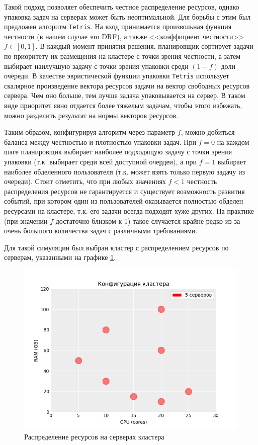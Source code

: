 Такой подход позволяет обеспечить честное распределение ресурсов, однако упаковка задач на серверах может быть неоптимальной. Для борьбы с этим был предложен алгоритм \texttt{Tetris}\cite{tetris-article}. На вход принимается произвольная функция честности (в нашем случае это DRF), а также <<коэффициент честности>> $f \in [0, 1]$. В каждый момент принятия решения, планировщик сортирует задачи по приоритету их размещения на кластере с точки зрения честности, а затем выбирает наилучшую задачу с точки зрения упаковки среди $(1 - f)$ доли очереди. В качестве эвристической функции упаковки \texttt{Tetris} использует скалярное произведение вектора ресурсов задачи на вектор свободных ресурсов сервера. Чем оно больше, тем лучше задача упаковывается на сервер. В таком виде приоритет явно отдается более тяжелым задачам, чтобы этого избежать, можно разделить результат на нормы векторов ресурсов. 

Таким образом, конфигурируя алгоритм через параметр $f$, можно добиться баланса между честностью и плотностью упаковки задач. При $f = 0$ на каждом шаге планировщик выбирает наиболее подходящую задачу с точки зрения упаковки (т.к. выбирает среди всей доступной очердеи), а при $f = 1$ выбирает наиболее обделенного пользователя (т.к. может взять только первую задачу из очереди). Стоит отметить, что при любых значениях $f < 1$ честность распределения ресурсов не гарантируется и существует возможность развития событий, при котором один из пользователей оказывается полностью обделен ресурсами на кластере, т.к. его задачи всегда подходят хуже других. На практике (при значении $f$ достаточно близком к 1) такое случается крайне редко из-за очень большого количества задач с различными требованиями. 

Для такой симуляции был выбран кластер с распределением ресурсов по серверам, указанными на графике \ref{fig:cluster-resources-distribution}.

\begin{figure}[h!]
    \centering 
    \includegraphics[width=0.7\linewidth]{images/hosts_distribution}
    \caption{Распределение ресурсов на серверах кластера}
    \label{fig:cluster-resources-distribution}
\end{figure}

